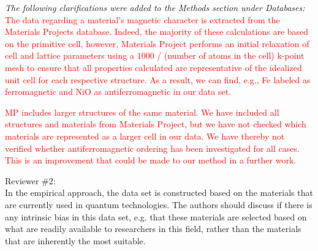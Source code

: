 \documentclass[11pt, a4paper]{letter} %
\newcommand{\mrk}[1]{\textcolor{red}{#1}}
\begin{document}
\textit{The following clarifications were added to the Methods section under Databases:} \\ 
\mrk{The data regarding a material's magnetic character is extracted from the Materials Projects database. Indeed, the majority of these calculations are based on the primitive cell, however, Materials Project performs an initial relaxation of cell and lattice parameters using a $1000$ / (number of atoms in the cell) k-point mesh to ensure that all properties calculated are representative of the idealized unit cell for each respective structure. As a result, we can find, e.g., Fe labeled as ferromagnetic and NiO as antiferromagnetic in our data set.} 

\mrk{MP includes larger structures of the same material. We have included all structures and materials from Materials Project, but we have not checked which materials are represented as a larger cell in our data. We have thereby not verified whether antiferromagnetic ordering has been investigated for all cases. This is an improvement that could be made to our method in a further work.}




Reviewer \#2: \\
In the empirical approach, the data set is constructed based on the materials that are currently used in quantum technologies. The authors should discuss if there is any intrinsic bias in this data set, e.g. that these materials are selected based on what are readily available to researchers in this field, rather than the materials that are inherently the most suitable.
\end{document}
